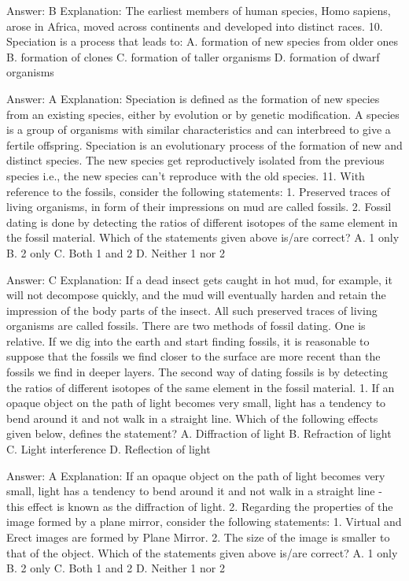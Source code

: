 Answer: B
Explanation: The earliest members of human species, Homo sapiens, arose in Africa, moved across continents and developed into distinct races. 10. Speciation is a process that leads to: A. formation of new species from older ones B. formation of clones C. formation of taller organisms D. formation of dwarf organisms 

Answer: A
Explanation: Speciation is defined as the formation of new species from an existing species, either by evolution or by genetic modification. A species is a group of organisms with similar characteristics and can interbreed to give a fertile offspring. Speciation is an evolutionary process of the formation of new and distinct species. The new species get reproductively isolated from the previous species i.e., the new species can’t reproduce with the old species. 11. With reference to the fossils, consider the following statements: 1. Preserved traces of living organisms, in form of their impressions on mud are called fossils. 2. Fossil dating is done by detecting the ratios of different isotopes of the same element in the fossil material. Which of the statements given above is/are correct? A. 1 only B. 2 only C. Both 1 and 2 D. Neither 1 nor 2 

Answer: C
Explanation: If a dead insect gets caught in hot mud, for example, it will not decompose quickly, and the mud will eventually harden and retain the impression of the body parts of the insect. All such preserved traces of living organisms are called fossils. There are two methods of fossil dating. One is relative. If we dig into the earth and start finding fossils, it is reasonable to suppose that the fossils we find closer to the surface are more recent than the fossils we find in deeper layers. The second way of dating fossils is by detecting the ratios of different isotopes of the same element in the fossil material. 1. If an opaque object on the path of light becomes very small, light has a tendency to bend around it and not walk in a straight line. Which of the following effects given below, defines the statement? A. Diffraction of light B. Refraction of light C. Light interference D. Reflection of light 

Answer: A
Explanation: If an opaque object on the path of light becomes very small, light has a tendency to bend around it and not walk in a straight line - this effect is known as the diffraction of light. 2. Regarding the properties of the image formed by a plane mirror, consider the following statements: 1. Virtual and Erect images are formed by Plane Mirror. 2. The size of the image is smaller to that of the object. Which of the statements given above is/are correct? A. 1 only B. 2 only C. Both 1 and 2 D. Neither 1 nor 2 

